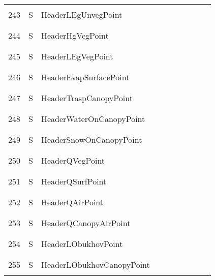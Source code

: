 \begin{longtable}{|c|c|l|c|c|c|c|p{}|c|p{}|}
&&&&&&&&&\\\hline%
&&&&&&&&&\\
243 & S & HeaderLEgUnvegPoint & & & & & & & \\
&&&&&&&&&\\\hline%
&&&&&&&&&\\
244 & S & HeaderHgVegPoint & & & & & & & \\
&&&&&&&&&\\\hline%
&&&&&&&&&\\
245 & S & HeaderLEgVegPoint & & & & & & & \\
&&&&&&&&&\\\hline%
&&&&&&&&&\\
246 & S & HeaderEvapSurfacePoint & & & & & & & \\
&&&&&&&&&\\\hline%
&&&&&&&&&\\
247 & S & HeaderTraspCanopyPoint & & & & & & & \\
&&&&&&&&&\\\hline%
&&&&&&&&&\\
248 & S & HeaderWaterOnCanopyPoint & & & & & & & \\
&&&&&&&&&\\\hline%
&&&&&&&&&\\
249 & S & HeaderSnowOnCanopyPoint & & & & & & & \\
&&&&&&&&&\\\hline%
&&&&&&&&&\\
250 & S & HeaderQVegPoint & & & & & & & \\
&&&&&&&&&\\\hline%
&&&&&&&&&\\
251 & S & HeaderQSurfPoint & & & & & & & \\
&&&&&&&&&\\\hline%
&&&&&&&&&\\
252 & S & HeaderQAirPoint & & & & & & & \\
&&&&&&&&&\\\hline%
&&&&&&&&&\\
253 & S & HeaderQCanopyAirPoint & & & & & & & \\
&&&&&&&&&\\\hline%
&&&&&&&&&\\
254 & S & HeaderLObukhovPoint & & & & & & & \\
&&&&&&&&&\\\hline%
&&&&&&&&&\\
255 & S & HeaderLObukhovCanopyPoint & & & & & & & \\
&&&&&&&&&\\\hline%

\end{longtable}
